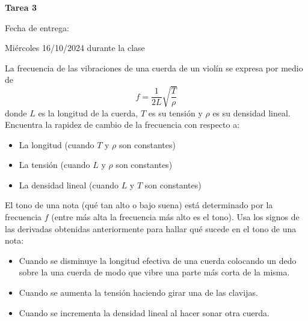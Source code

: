\documentclass[10pt]{exam}
\begin{document}
\centering


\Large 
\textbf{Tarea 3}

\normalsize
Fecha de entrega: 

Miércoles 16/10/2024 durante la clase




\pointformat{\bfseries\boldmath(\thepoints)}
\vskip10pt

\begin{questions}
    

    \question La frecuencia de las vibraciones de una cuerda de un violín se expresa por medio de
$$f=\frac{1}{2L}\sqrt{\frac{T}{\rho}}$$
donde $L$ es la longitud de la cuerda, $T$ es su tensión y $\rho$ es su densidad lineal. Encuentra la rapidez de cambio de la frecuencia con respecto a:
\begin{itemize}
    \item La longitud (cuando $T$ y $\rho$ son constantes)
    \item La tensión (cuando $L$ y $\rho$ son constantes)
    \item La densidad lineal (cuando $L$ y $T$ son constantes)
\end{itemize}{}

El tono de una nota (qué tan alto o bajo suena) está determinado por la frecuencia $f$ (entre más alta la frecuencia más alto es el tono). Usa los signos de las derivadas obtenidas anteriormente para hallar qué sucede en el tono de una nota:
\begin{itemize}
    \item Cuando se disminuye la longitud efectiva de una cuerda colocando un dedo sobre la una cuerda de modo
que vibre una parte más corta de la misma.
    \item Cuando se aumenta la tensión haciendo girar una de las clavijas.
    \item Cuando se incrementa la densidad lineal al hacer sonar otra cuerda.
\end{itemize}{}


\end{questions}
\end{document}
